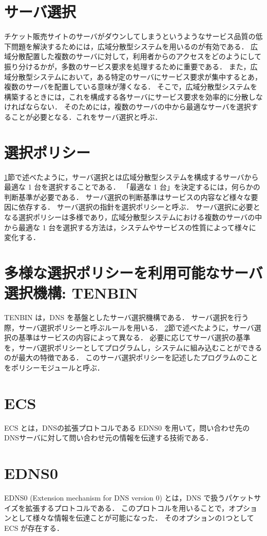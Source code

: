 \documentclass[a4j,12pt,onecolumn,oneside,titlepage,openany,final]{jreport}
\begin{document}
\section{サーバ選択}\label{server_select}
チケット販売サイトのサーバがダウンしてしまうというようなサービス品質の低下問題を解決するためには，広域分散型システムを用いるのが有効である．
広域分散配置した複数のサーバに対して，利用者からのアクセスをどのようにして振り分けるかが，多数のサービス要求を処理するために重要である．
また，広域分散型システムにおいて，ある特定のサーバにサービス要求が集中するとあ，複数のサーバを配置している意味が薄くなる．
そこで，広域分散型システムを構築するときには，これを構成する各サーバにサービス要求を効率的に分散しなければならない．
そのためには，複数のサーバの中から最適なサーバを選択することが必要となる．これをサーバ選択と呼ぶ．

\section{選択ポリシー}\label{select_policy}
\ref{server_select}節で述べたように，サーバ選択とは広域分散型システムを構成するサーバから最適な 1 台を選択することである．
「最適な 1 台」を決定するには，何らかの判断基準が必要である．
サーバ選択の判断基準はサービスの内容など様々な要因に依存する．
サーバ選択の指針を選択ポリシーと呼ぶ．
サーバ選択に必要となる選択ポリシーは多様であり，広域分散型システムにおける複数のサーバの中から最適な 1 台を選択する方法は，システムやサービスの性質によって様々に変化する．

\section{多様な選択ポリシーを利用可能なサーバ選択機構: TENBIN}
TENBIN は，DNS を基盤としたサーバ選択機構である．
サーバ選択を行う際，サーバ選択ポリシーと呼ぶルールを用いる．
\ref{select_policy}節で述べたように，サーバ選択の基準はサービスの内容によって異なる．
必要に応じてサーバ選択の基準を，サーバ選択ポリシーとしてプログラムし，システムに組み込むことができるのが最大の特徴である．
このサーバ選択ポリシーを記述したプログラムのことをポリシーモジュールと呼ぶ．

\section{ECS}
ECS とは，DNSの拡張プロトコルである EDNS0\cite{edns0} を用いて，問い合わせ先のDNSサーバに対して問い合わせ元の情報を伝達する技術である．

\section{EDNS0}
EDNS0 (Extension mechanism for DNS version 0) とは，DNS で扱うパケットサイズを拡張するプロトコルである．
このプロトコルを用いることで，オプションとして様々な情報を伝達ことが可能になった．
そのオプションの1つとして ECS が存在する．
\end{document}
